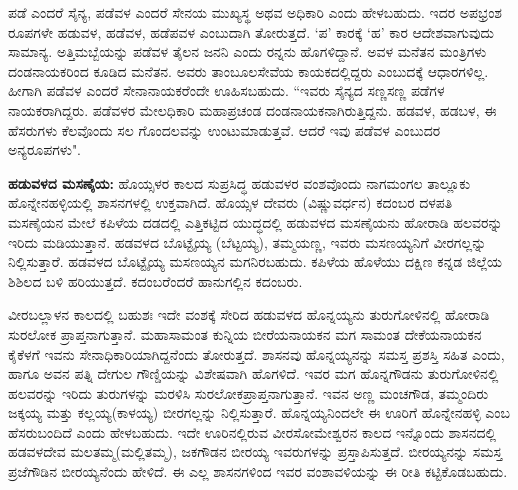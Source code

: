ಪಡೆ ಎಂದರೆ ಸೈನ್ಯ, ಪಡೆವಳ ಎಂದರೆ ಸೇನಯ ಮುಖ್ಯಸ್ಥ ಅಥವ ಅಧಿಕಾರಿ ಎಂದು ಹೇಳಬಹುದು. ಇದರ ಅಪಭ್ರಂಶ ರೂಪಗಳೇ ಹಡುವಳ, ಹಡೆವಳ, ಹಡೆಪವಳ ಎಂಬುದಾಗಿ ತೋರುತ್ತದೆ. ‘ಪ’ ಕಾರಕ್ಕೆ ‘ಹ’ ಕಾರ ಆದೇಶವಾಗುವುದು ಸಾಮಾನ್ಯ. ಅತ್ತಿಮಬ್ಬೆಯನ್ನು ಪಡೆವಳ ತೈಲನ ಜನನಿ ಎಂದು ರನ್ನನು ಹೊಗಳಿದ್ದಾನೆ. ಅವಳ ಮನೆತನ ಮಂತ್ರಿಗಳು ದಂಡನಾಯಕರಿಂದ ಕೂಡಿದ ಮನೆತನ. ಅವರು ತಾಂಬೂಲಸೇವೆಯ ಕಾಯಕದಲ್ಲಿದ್ದರು ಎಂಬುದಕ್ಕೆ ಆಧಾರಗಳಿಲ್ಲ. ಹೀಗಾಗಿ ಪಡೆವಳ ಎಂದರೆ ಸೇನಾನಾಯಕರೆಂದೇ ಊಹಿಸಬಹುದು. “ಇವರು ಸೈನ್ಯದ ಸಣ್ಣಸಣ್ಣ ಪಡೆಗಳ ನಾಯಕರಾಗಿದ್ದರು. ಪಡೆವಳರ ಮೇಲಧಿಕಾರಿ ಮಹಾಪ್ರಚಂಡ ದಂಡನಾಯಕನಾಗಿರುತ್ತಿದ್ದನು. ಹಡವಳ, ಹಡಬಳ, ಈ ಹೆಸರುಗಳು ಕೆಲವೊಂದು ಸಲ ಗೊಂದಲವನ್ನು ಉಂಟುಮಾಡುತ್ತವೆ. ಆದರೆ ಇವು ಪಡೆವಳ ಎಂಬುದರ ಅನ್ಯರೂಪಗಳು".

\textbf{ಹಡುವಳದ ಮಸಣೈಯ:} ಹೊಯ್ಸಳರ ಕಾಲದ ಸುಪ್ರಸಿದ್ಧ ಹಡುವಳರ ವಂಶವೊಂದು ನಾಗಮಂಗಲ ತಾಲ್ಲೂಕು ಹೊನ್ನೇನಹಳ್ಳಿಯಲ್ಲಿ ಶಾಸನಗಳಲ್ಲಿ ಉಕ್ತವಾಗಿದೆ. ಹೊಯ್ಸಳ ದೇವರು (ವಿಷ್ಣುವರ್ಧನ) ಕದಂಬರ ದಳಪತಿ ಮಸಣೈಯನ ಮೇಲೆ ಕಪಿಳೆಯ ದಡದಲ್ಲಿ ಎತ್ತಿಕಟ್ಟಿದ ಯುದ್ಧದಲ್ಲಿ ಹಡುವಳದ ಮಸಣೈಯನು ಹೋರಾಡಿ ಹಲವರನ್ನು ಇರಿದು ಮಡಿಯುತ್ತಾನೆ. ಹಡವಳದ ಬೊಟ್ಟೈಯ್ಯ (ಬೆಟ್ಟಯ್ಯ), ತಮ್ಮಯಣ್ಣ, ಇವರು ಮಸಣಯ್ಯನಿಗೆ ವೀರಗಲ್ಲನ್ನು ನಿಲ್ಲಿಸುತ್ತಾರೆ. ಹಡವಳದ ಬೊಟ್ಟೈಯ್ಯ ಮಸಣಯ್ಯನ ಮಗನಿರಬಹುದು. ಕಪಿಳೆಯ ಹೊಳೆಯು ದಕ್ಷಿಣ ಕನ್ನಡ ಜಿಲ್ಲೆಯ ಶಿಶಿಲದ ಬಳಿ ಹರಿಯುತ್ತದೆ. ಕದಂಬರೆಂದರೆ ಹಾನುಗಲ್ಲಿನ ಕದಂಬರು.

ವೀರಬಲ್ಲಾಳನ ಕಾಲದಲ್ಲಿ ಬಹುಶಃ ಇದೇ ವಂಶಕ್ಕೆ ಸೇರಿದ ಹಡುವಳದ ಹೊನ್ನಯ್ಯನು ತುರುಗೋಳಿನಲ್ಲಿ ಹೋರಾಡಿ ಸುರಲೋಕ ಪ್ರಾಪ್ತನಾಗುತ್ತಾನೆ. ಮಹಾಸಾಮಂತ ಕುನ್ನಿಯ ಬೀರೆಯನಾಯಕನ ಮಗ ಸಾಮಂತ ದೇಕೆಯನಾಯಕನ ಕೈಕೆಳಗೆ ಇವನು ಸೇನಾಧಿಕಾರಿಯಾಗಿದ್ದನೆಂದು ತೋರುತ್ತದೆ. ಶಾಸನವು ಹೊನ್ನಯ್ಯನನ್ನು ಸಮಸ್ತ ಪ್ರಶಸ್ತಿ ಸಹಿತ ಎಂದು, ಹಾಗೂ ಅವನ ಪತ್ನಿ ದೇಗುಲ ಗೌಣ್ಡಿಯನ್ನು ವಿಶೇಷವಾಗಿ ಹೊಗಳಿದೆ. ಇವರ ಮಗ ಹೊನ್ನಗೌಡನು ತುರುಗೋಳಿನಲ್ಲಿ ಹಲವರನ್ನು ಇರಿದು ತುರುಗಳನ್ನು ಮರಳಿಸಿ ಸುರಲೋಕಪ್ರಾಪ್ತನಾಗುತ್ತಾನೆ. ಇವನ ಅಣ್ಣ ಮಂಚಗೌಡ, ತಮ್ಮಂದಿರು ಜಕ್ಕಯ್ಯ ಮತ್ತು ಕಲ್ಲಯ್ಯ(ಕಾಳಯ್ಯ) ಬೀರಗಲ್ಲನ್ನು ನಿಲ್ಲಿಸುತ್ತಾರೆ. ಹೊನ್ನಯ್ಯನಿಂದಲೇ ಈ ಊರಿಗೆ ಹೊನ್ನೇನಹಳ್ಳಿ ಎಂಬ ಹೆಸರುಬಂದಿದೆ ಎಂದು ಹೇಳಬಹುದು. ಇದೇ ಊರಿನಲ್ಲಿರುವ ವೀರಸೋಮೇಶ್ವರನ ಕಾಲದ ಇನ್ನೊಂದು ಶಾಸನದಲ್ಲಿ ಹಡವಳದೇವ ಮಲತಮ್ಮ(ಮಲ್ಲಿತಮ್ಮ), ಜಕಗೌಡನ ಬೀರಯ್ಯ ಇವರುಗಳನ್ನು ಪ್ರಸ್ತಾಪಿಸುತ್ತದೆ. ಬೀರಯ್ಯನನ್ನು ಸಮಸ್ತ ಪ್ರಜೆಗೌಡಿನ ಬೀರಯ್ಯನೆಂದು ಹೇಳಿದೆ. ಈ ಎಲ್ಲ ಶಾಸನಗಳಿಂದ ಇವರ ವಂಶಾವಳಿಯನ್ನು ಈ ರೀತಿ ಕಟ್ಟಿಕೊಡಬಹುದು.

